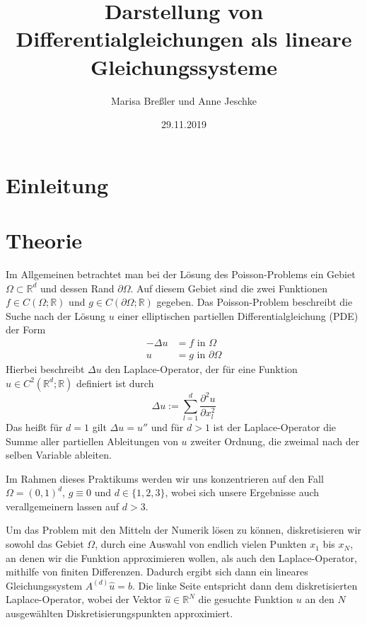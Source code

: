 \documentclass{scrartcl}
\newcommand{\R}{\mathbb{R}}
\begin{document}
\title{Darstellung von Differentialgleichungen als lineare Gleichungssysteme}
\author{Marisa Breßler und Anne Jeschke}
\date{29.11.2019}
\maketitle

\tableofcontents

\pagebreak
\section{Einleitung}

\pagebreak
\section{Theorie}
Im Allgemeinen betrachtet man bei der Lösung des Poisson-Problems ein Gebiet $\Omega\subset\R^d$ und dessen Rand $\partial\Omega$.
Auf diesem Gebiet sind die zwei Funktionen $f\in C(\Omega ; \R)$ und $g\in C(\partial\Omega ; \R)$ gegeben.
Das Poisson-Problem beschreibt die Suche nach der Lösung $u$ einer elliptischen partiellen Differentialgleichung (PDE) der Form
\[\begin{split}
-\Delta u &= f \textrm{ in } \Omega\\
        u &= g \textrm{ in } \partial\Omega
\end{split}
\]
Hierbei beschreibt $\Delta u$ den Laplace-Operator, der für eine Funktion $u\in C^2(\R^d;\R)$ definiert ist durch \[\Delta u := \sum_{l=1}^{d} \frac{\partial^2 u}{\partial x^2_l}\]
Das heißt für $d=1$ gilt $\Delta u = u''$ und für $d>1$ ist der Laplace-Operator die Summe aller partiellen Ableitungen von $u$ zweiter Ordnung, die zweimal nach der selben Variable ableiten.

Im Rahmen dieses Praktikums werden wir uns konzentrieren auf den Fall $\Omega=(0,1)^d$, $g\equiv0$ und $d\in\{1, 2, 3\}$, wobei sich unsere Ergebnisse auch verallgemeinern lassen auf $d>3$.

Um das Problem mit den Mitteln der Numerik lösen zu können, diskretisieren wir sowohl das Gebiet $\Omega$, durch eine Auswahl von endlich vielen Punkten $x_1$ bis $x_N$, an denen wir die Funktion approximieren wollen, als auch den Laplace-Operator, mithilfe von finiten Differenzen.
Dadurch ergibt sich dann ein lineares Gleichungssystem $A^{(d)}\hat{u}=b$. Die linke Seite entspricht dann dem diskretisierten Laplace-Operator, wobei der Vektor $\hat{u}\in\R^N$ die gesuchte Funktion $u$ an den $N$ ausgewählten Diskretisierungspunkten approximiert.
\end{document}

